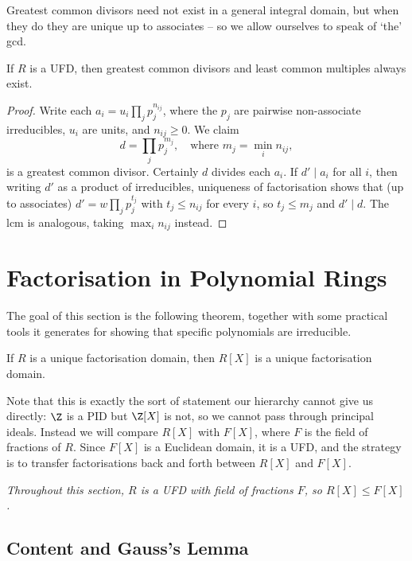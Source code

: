 Greatest common divisors need not exist in a general integral domain, but when they do they are unique up to associates -- so we allow ourselves to speak of `the' gcd.

\begin{proposition}
	If $R$ is a UFD, then greatest common divisors and least common multiples always exist.
\end{proposition}
\begin{proof}
	Write each $a_i = u_i \prod_j p_j^{n_{ij}}$, where the $p_j$ are pairwise non-associate irreducibles, $u_i$ are units, and $n_{ij} \geq 0$. We claim
	$$
	d = \prod_j p_j^{m_j}, \quad \text{where } m_j = \min_i n_{ij},
	$$
	is a greatest common divisor. Certainly $d$ divides each $a_i$. If $d' \mid a_i$ for all $i$, then writing $d'$ as a product of irreducibles, uniqueness of factorisation shows that (up to associates) $d' = w\prod_j p_j^{t_j}$ with $t_j \leq n_{ij}$ for every $i$, so $t_j \leq m_j$ and $d' \mid d$. The lcm is analogous, taking $\max_i n_{ij}$ instead.
\end{proof}

\section{Factorisation in Polynomial Rings}

The goal of this section is the following theorem, together with some practical tools it generates for showing that specific polynomials are irreducible.

\begin{theorem}
	If $R$ is a unique factorisation domain, then $R[X]$ is a unique factorisation domain.
\end{theorem}

Note that this is exactly the sort of statement our hierarchy cannot give us directly: $\Z$ is a PID but $\Z[X]$ is not, so we cannot pass through principal ideals. Instead we will compare $R[X]$ with $F[X]$, where $F$ is the field of fractions of $R$. Since $F[X]$ is a Euclidean domain, it is a UFD, and the strategy is to transfer factorisations back and forth between $R[X]$ and $F[X]$.

\emph{Throughout this section, $R$ is a UFD with field of fractions $F$, so $R[X] \leq F[X]$.}

\subsection{Content and Gauss's Lemma}

